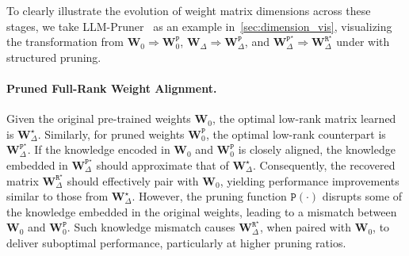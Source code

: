 To clearly illustrate the evolution of weight matrix dimensions across these stages, we take LLM-Pruner~\citep{ma2023llmpruner} as an example in~\cref{sec:dimension_vis}, visualizing the transformation from $\mathbf{W}_{0} \Rightarrow \mathbf{W}_{0}^\mathtt{P}$, $\mathbf{W}_{\Delta} \Rightarrow \mathbf{W}_{\Delta}^\mathtt{P}$, and $\mathbf{W}_{\Delta}^{\mathtt{P}^{\star}}\Rightarrow \mathbf{W}_{\Delta}^{\mathtt{R}^{\star}}$ under \method with structured pruning. 


\paragraph{Pruned Full-Rank Weight Alignment.}
Given the original pre-trained weights $\mathbf{W}_{0}$, the optimal low-rank matrix learned is $\mathbf{W}_{\Delta}^{\star}$. 
Similarly, for pruned weights $\mathbf{W}_{0}^\mathtt{P}$, the optimal low-rank counterpart is $\mathbf{W}_{\Delta}^{\mathtt{P}^{\star}}$.
If the knowledge encoded in $\mathbf{W}_{0}$ and $\mathbf{W}_{0}^\mathtt{P}$ is closely aligned, the knowledge embedded in $\mathbf{W}_{\Delta}^{\mathtt{P}^{\star}}$ should approximate that of $\mathbf{W}_{\Delta}^{\star}$. 
Consequently, the recovered matrix $\mathbf{W}_{\Delta}^{\mathtt{R}^{\star}}$ should effectively pair with $\mathbf{W}_{0}$, yielding performance improvements similar to those from $\mathbf{W}_{\Delta}^{\star}$.
However, the pruning function $\mathtt{P}(\cdot)$ disrupts some of the knowledge embedded in the original weights, leading to a mismatch between $\mathbf{W}_{0}$ and $\mathbf{W}_{0}^\mathtt{P}$. Such knowledge mismatch causes $\mathbf{W}_{\Delta}^{\mathtt{R}^{\star}}$, when paired with $\mathbf{W}_0$, to deliver suboptimal performance, particularly at higher pruning ratios.


